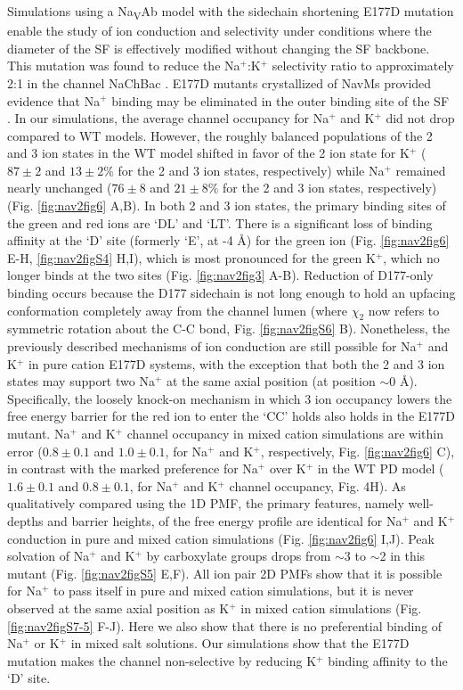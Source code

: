 \begin{refsection}
Simulations using a Na\textsubscript{V}Ab model with the sidechain shortening E177D mutation enable the study of ion conduction and selectivity under conditions where the diameter of the SF is effectively modified without changing the SF backbone. This mutation was found to reduce the Na$^+$:K$^+$ selectivity ratio to approximately 2:1 in the channel NaChBac \cite{FinolUrdaneta:2014bz}. E177D mutants crystallized of NavMs provided evidence that Na$^+$ binding may be eliminated in the outer binding site of the SF \cite{Naylor:2016cu}. In our simulations, the average channel occupancy for Na$^+$ and K$^+$ did not drop compared to WT models. However, the roughly balanced populations of the 2 and 3 ion states in the WT model shifted in favor of the 2 ion state for K$^+$ ($87\pm2$ and $13\pm2$\% for the 2 and 3 ion states, respectively) while Na$^+$ remained nearly unchanged ($76\pm8$ and $21\pm8$\% for the 2 and 3 ion states, respectively) (Fig. \ref{fig:nav2fig6} A,B). In both 2 and 3 ion states, the primary binding sites of the green and red ions are `DL' and `LT'. There is a significant loss of binding affinity at the `D' site (formerly `E', at -4 \AA) for the green ion (Fig. \ref{fig:nav2fig6} E-H, \ref{fig:nav2figS4} H,I), which is most pronounced for the green K$^+$, which no longer binds at the two sites (Fig. \ref{fig:nav2fig3} A-B). Reduction of D177-only binding occurs because the D177 sidechain is not long enough to  hold an upfacing conformation completely away from the channel lumen (where $\chi_2$ now refers to symmetric rotation about the C-C bond, Fig. \ref{fig:nav2figS6} B). Nonetheless, the previously described mechanisms of ion conduction are still possible for Na$^+$ and K$^+$ in pure cation E177D systems, with the exception that both the 2 and 3 ion states may support two Na$^+$ at the same axial position (at position $\sim$0 \AA). Specifically, the loosely knock-on mechanism in which 3 ion occupancy lowers the free energy barrier for the red ion to enter the `CC' holds also holds in the E177D mutant.
Na$^+$ and K$^+$ channel occupancy in mixed cation simulations are within error ($0.8\pm0.1$ and $1.0\pm0.1$, for Na$^+$ and K$^+$, respectively, Fig. \ref{fig:nav2fig6} C), in contrast with the marked preference for Na$^+$ over K$^+$ in the WT PD model ($1.6\pm0.1$ and $0.8\pm0.1$, for Na$^+$ and K$^+$ channel occupancy, Fig. 4H). As qualitatively compared using the 1D PMF, the primary features, namely well-depths and barrier heights, of the free energy profile are identical for Na$^+$ and K$^+$ conduction in pure and mixed cation simulations (Fig. \ref{fig:nav2fig6} I,J). Peak solvation of Na$^+$ and K$^+$ by carboxylate groups drops from $\sim$3 to $\sim$2 in this mutant (Fig. \ref{fig:nav2figS5} E,F). All ion pair 2D PMFs show that it is possible for Na$^+$ to pass itself in pure and mixed cation simulations, but it is never observed at the same axial position as K$^+$ in mixed cation simulations (Fig. \ref{fig:nav2figS7-5} F-J). Here we also show that there is no preferential binding of Na$^+$ or K$^+$ in mixed salt solutions. Our simulations show that the E177D mutation makes the channel non-selective by reducing K$^+$ binding affinity to the `D' site. 


\end{refsection}
